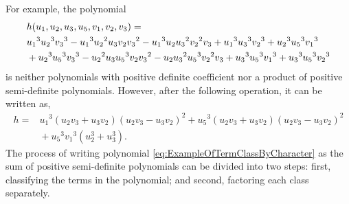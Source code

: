 \documentclass[10pt,a4paper]{article}
\begin{document}
For example, the polynomial
\begin{align}
  & h(u_{{1}}, u_{{2}}, u_{{3}}, u_{{5}}, v_{{1}}, v_{{2}}, v_{{3}}) = {}\notag\\
  & {u_{{1}}}^{3}{u_{{2}}}^{3}{v_{{3}}}^{3} - {u_{{1}}}^{3}{u_{{2}}}^{2}u_{{3}}v_{{2}}{v_{{3}}}^{2} - {u_{{1}}}^{3}u_{{2}}{u_{{3}}}^{2}{v_{{2}}}^{2}v_{{3}} + {u_{{1}}}^{3}{u_{{3}}}^{3}{v_{{2}}}^{3} + {u_{{2}}}^{3}{u_{{5}}}^{3}{v_{{1}}}^{3}\notag\\
  & {} + {u_{{2}}}^{3}{u_{{5}}}^{3}{v_{{3}}}^{3} - {u_{{2}}}^{2}u_{{3}}{u_{{5}}}^{3}v_{{2}}{v_{{3}}}^{2} - u_{{2}}{u_{{3}}}^{2}{u_{{5}}}^{3}{v_{{2}}}^{2}v_{{3}} + {u_{{3}}}^{3}{u_{{5}}}^{3}{v_{{1}}}^{3} + {u_{{3}}}^{3}{u_{{5}}}^{3}{v_{{2}}}^{3}\label{eq:ExampleOfTermClassByCharacter}
\end{align}
is neither polynomials with positive definite coefficient nor a product of positive semi-definite polynomials. However, after the following operation, it can be written as,
\begin{align*}
  h = {} & {u_{{1}}}^{3} \left( u_{{2}}v_{{3}} + u_{{3}}v_{{2}} \right)  \left( u_{{2}}v_{{3}} - u_{{3}}v_{{2}} \right) ^{2} + {u_{{5}}}^{3} \left( u_{{2}}v_{{3}} + u_{{3}}v_{{2}} \right)  \left( u_{{2}}v_{{3}} - u_{{3}}v_{{2}} \right) ^{2}\\
  & {} + {u_{{5}}}^{3}{v_{{1}}}^{3} \left( u_{{2}}^{3} + u_{{3}}^{3} \right).
\end{align*}
The process of writing polynomial \eqref{eq:ExampleOfTermClassByCharacter} as the sum of positive semi-definite polynomials can be divided into two steps: first, classifying the terms in the polynomial; and second, factoring each class separately.
\end{document}
